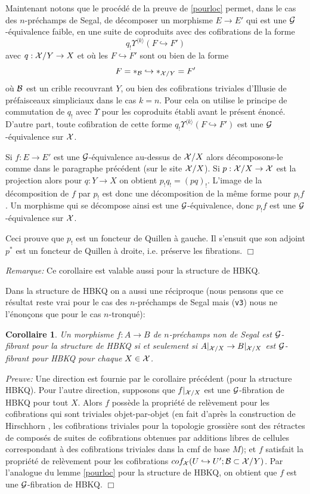 \documentclass[12pt]{article}
\newcommand{\eop}{\hfill $\Box$\vspace{.1in}}
\newtheorem{corollaire}[lemma]{Corollaire}
\newcommand{\Gg}{{\cal G}}
\newcommand{\Bb}{{\cal B}}
\newcommand{\Xx}{{\cal X}}
\begin{document}
Maintenant notons que le proc\'ed\'e de la preuve de \ref{pourloc} permet, dans le
cas des $n$-pr\'echamps de Segal, de d\'ecomposer un morphisme $E\rightarrow E'$
qui est une $\Gg$-\'equivalence faible, en une suite de coproduits avec des
cofibrations de la forme 
$$
q_!\Upsilon ^{\langle k \rangle } (F\hookrightarrow F')
$$
avec $q: \Xx /Y\rightarrow X$ et 
o\`u les $F\hookrightarrow F'$ sont ou bien de la forme 
$$
F = \ast _{\Bb} \hookrightarrow \ast _{\Xx /Y} = F'
$$ 
o\`u $\Bb$ est un crible recouvrant $Y$, ou bien
 des cofibrations triviales d'Illusie
de pr\'efaisceaux simpliciaux dans le cas $k=n$. Pour cela 
on utilise le principe de
commutation de $q_!$ avec $\Upsilon$ pour les coproduits \'etabli avant le
pr\'esent \'enonc\'e. 
D'autre part, toute cofibration de cette forme 
$q_!\Upsilon ^{\langle k \rangle } (F\hookrightarrow F')$ est une
$\Gg$-\'equivalence sur $\Xx$. 

Si $f:E\rightarrow E'$ est une $\Gg$-\'equivalence au-dessus de $\Xx / X$ alors
d\'ecomposons-le comme dans le paragraphe pr\'ec\'edent (sur le site $\Xx /X$). 
Si $p: \Xx /X\rightarrow \Xx$ est la projection alors pour $q: Y\rightarrow X$
on obtient $p_! q_! = (pq)_!$. L'image de la d\'ecomposition de
$f$ par $p_!$ est donc une d\'ecomposition de la m\^eme forme pour $p_!f$.
Un morphisme qui se d\'ecompose ainsi est une $\Gg$-\'equivalence, donc 
$p_!f$ est une $\Gg$-\'equivalence sur $\Xx$.

Ceci prouve que $p_!$ est un foncteur de
Quillen \`a gauche. Il s'ensuit que  son adjoint $p^{\ast}$ est un foncteur de
Quillen \`a droite, i.e. pr\'eserve les fibrations.
\eop

{\em Remarque:} Ce corollaire est valable aussi pour la structure de HBKQ.

Dans la structure de HBKQ on a aussi une r\'eciproque 
(nous pensons que ce r\'esultat
reste vrai pour le cas des $n$-pr\'echamps de Segal mais ({\tt v3})
nous ne l'\'enon\c{c}ons
que pour le cas $n$-tronqu\'e):

\begin{corollaire}
\label{restrpourhbkq}
Un morphisme $f: A\rightarrow B$ de $n$-pr\'echamps non de Segal 
est $\Gg$-fibrant pour la structure de HBKQ
si et seulement si $A|_{\Xx /X} \rightarrow B|_{\Xx /X}$ est $\Gg$-fibrant pour
HBKQ pour chaque $X\in \Xx$.
\end{corollaire}
{\em Preuve:}
Une direction est fournie par le corollaire pr\'ec\'edent (pour la structure
HBKQ). Pour l'autre direction, supposons que $f|_{\Xx /X}$ est une
$\Gg$-fibration de HBKQ pour tout $X$. Alors $f$ poss\`ede la propri\'et\'e de
rel\`evement pour les cofibrations qui sont triviales objet-par-objet
(en fait d'apr\`es la construction de Hirschhorn
\cite{Hirschhorn}, les cofibrations triviales
pour la topologie grossi\`ere sont des r\'etractes de compos\'es de suites
de cofibrations obtenues par additions libres de cellules correspondant
\`a des
cofibrations triviales dans la cmf de base $M$); et $f$ satisfait la
propri\'et\'e de rel\`evement pour les cofibrations
$cof_{\Xx }(U\hookrightarrow U'; \Bb \subset \Xx /Y)$. Par l'analogue du
lemme \ref{pourloc} pour la structure de HBKQ, on obtient que $f$ est une
$\Gg$-fibration de HBKQ.
\eop
\end{document}
